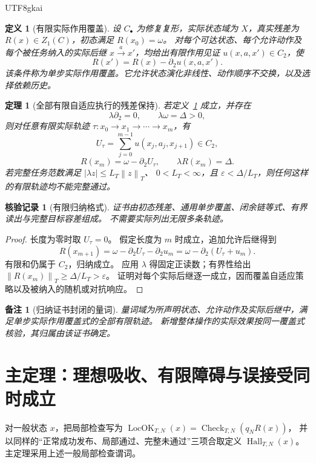 \documentclass[12pt,a4paper,openany]{report}
\newtheorem{definition}{定义}[chapter]
\newtheorem{theorem}{定理}[chapter]
\newtheorem{remark}{备注}[chapter]
\newtheorem{Certificate}{核验记录}[chapter]
\numberwithin{equation}{chapter}
\newcommand{\LocOK}{\operatorname{LocOK}}
\newcommand{\Hall}{\operatorname{Hall}}
\newcommand{\Norm}[1]{\left\lVert#1\right\rVert}
\begin{document}
\begin{CJK*}{UTF8}{gkai}
\begin{definition}[有限实际作用覆盖]
\label{def:coverage}
设 $C_\bullet$ 为修复复形，实际状态域为 $X$，真实残差为
$R(x)\in Z_1(C)$，初态满足 $R(x_0)=\omega$。
对每个可达状态、每个允许动作及每个被任务纳入的实际后继
$x\xrightarrow a x'$，均给出有限作用见证
$u(x,a,x')\in C_2$，使
\[
 \boxed{R(x')=R(x)-\partial_2u(x,a,x')}.
\]
该条件称为单步实际作用覆盖。它允许状态演化非线性、动作顺序不交换，以及选择依赖历史。
\end{definition}

\begin{theorem}[全部有限自适应执行的残差保持]
\label{thm:all-finite}
若定义~\ref{def:coverage} 成立，并存在
\[
 \lambda\partial_2=0,\qquad\lambda\omega=\Delta>0,
\]
则对任意有限实际轨迹
$\tau:x_0\to x_1\to\cdots\to x_m$，有
\[
 U_\tau=\sum_{j=0}^{m-1}u(x_j,a_j,x_{j+1})\in C_2,
\]
\[
 \boxed{R(x_m)=\omega-\partial_2U_\tau,\qquad
        \lambda R(x_m)=\Delta}.
\]
若完整任务范数满足 $|\lambda z|\le L_T\Norm z_T$、
$0<L_T<\infty$，且 $\varepsilon<\Delta/L_T$，则任何这样的有限轨迹均不能完整通过。
\end{theorem}
\begin{Certificate}[有限归纳格式]
证书由初态残差、通用单步覆盖、闭余链等式、有界读出与完整目标容差组成。
不需要实际列出无限多条轨迹。
\end{Certificate}
\begin{proof}
长度为零时取 $U_\tau=0$。
假定长度为 $m$ 时成立，追加允许后继得到
\[
 R(x_{m+1})
 =\omega-\partial_2U_\tau-\partial_2u_m
 =\omega-\partial_2(U_\tau+u_m).
\]
有限和仍属于 $C_2$，归纳成立。
应用 $\lambda$ 得固定正读数；有界性给出
$\Norm{R(x_m)}_T\ge\Delta/L_T>\varepsilon$。
证明对每个实际后继逐一成立，因而覆盖自适应策略以及被纳入的随机或对抗响应。
\end{proof}

\begin{remark}[归纳证书封闭的量词]
量词域为所声明状态、允许动作及实际后继中，满足单步实际作用覆盖式的全部有限轨迹。
新增整体操作的实际效果按同一覆盖式核验，其归属由该证书确定。
\end{remark}

\section{主定理：理想吸收、有限障碍与误接受同时成立}

对一般状态 $x$，把局部检查写为
$\LocOK_{T,N}(x)=\operatorname{Check}_{T,N}(q_NR(x))$，
并以同样的“正常成功发布、局部通过、完整未通过”三项合取定义 $\Hall_{T,N}(x)$。
主定理采用上述一般局部检查谓词。


\end{CJK*}
\end{document}
